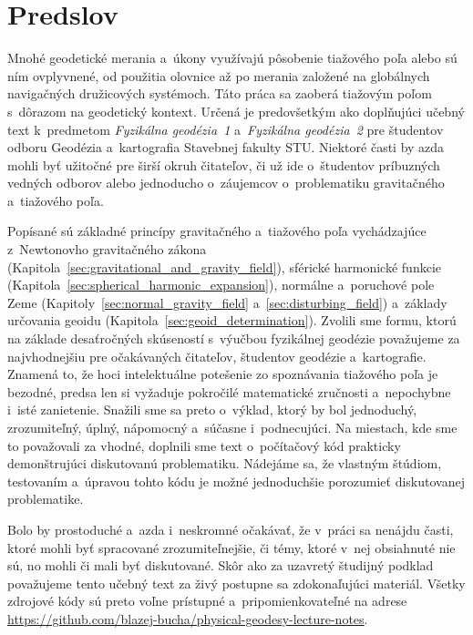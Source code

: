 \documentclass[a4paper, 12pt]{book}
\begin{document}

\chapter*{Predslov}

Mnohé geodetické merania a~úkony využívajú pôsobenie tiažového poľa alebo sú 
ním ovplyvnené, od použitia olovnice až po merania založené na globálnych 
navigačných družicových systémoch.  Táto práca sa zaoberá tiažovým poľom 
s~dôrazom na geodetický kontext.  Určená je predovšetkým ako doplňujúci učebný 
text k~predmetom \emph{Fyzikálna geodézia~1} a~\emph{Fyzikálna geodézia~2} pre 
študentov odboru Geodézia a~kartografia Stavebnej fakulty STU.  Niektoré časti 
by azda mohli byť užitočné pre širší okruh čitateľov, či už ide o~študentov 
príbuzných vedných odborov alebo jednoducho o~záujemcov o~problematiku 
gravitačného a~tiažového poľa.

Popísané sú základné princípy gravitačného a~tiažového poľa vychádzajúce 
z~Newtonovho gravitačného zákona 
(Kapitola~\ref{sec:gravitational_and_gravity_field}), sférické harmonické 
funkcie (Kapitola~\ref{sec:spherical_harmonic_expansion}), normálne a~poruchové 
pole Zeme (Kapitoly~\ref{sec:normal_gravity_field} 
a~\ref{sec:disturbing_field}) a~základy určovania geoidu 
(Kapitola~\ref{sec:geoid_determination}).  Zvolili sme formu, ktorú na základe 
desaťročných skúseností s~výučbou fyzikálnej geodézie považujeme za 
najvhodnejšiu pre očakávaných čitateľov, študentov geodézie a~kartografie.  
Znamená to, že hoci intelektuálne potešenie zo spoznávania tiažového poľa je 
bezodné, predsa len si vyžaduje pokročilé matematické zručnosti a~nepochybne 
i~isté zanietenie.  Snažili sme sa preto o~výklad, ktorý by bol jednoduchý, 
zrozumiteľný, úplný, nápomocný a~súčasne i~podnecujúci.  Na miestach, kde sme 
to považovali za vhodné, doplnili sme text o~počítačový kód prakticky 
demonštrujúci diskutovanú problematiku.  Nádejáme sa, že vlastným štúdiom, 
testovaním a~úpravou tohto kódu je možné jednoduchšie porozumieť diskutovanej 
problematike.

Bolo by prostoduché a~azda i~neskromné očakávať, že v~práci sa nenájdu časti, 
ktoré mohli byť spracované zrozumiteľnejšie, či témy, ktoré v~nej obsiahnuté 
nie sú, no mohli či mali byť diskutované.  Skôr ako za uzavretý študijný 
podklad považujeme tento učebný text za živý postupne sa zdokonaľujúci 
materiál.  Všetky zdrojové kódy sú preto voľne prístupné a~pripomienkovateľné 
na adrese \url{https://github.com/blazej-bucha/physical-geodesy-lecture-notes}.
\end{document}
